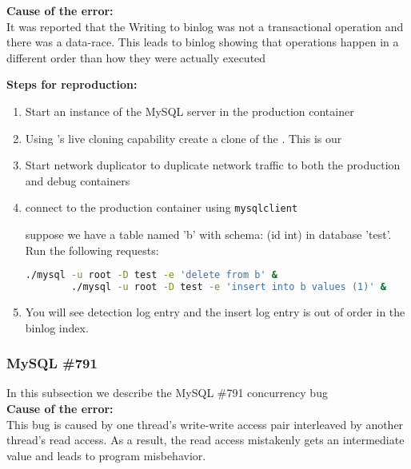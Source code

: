 \noindent \textbf{Cause of the error:} \\
It was reported that the Writing to binlog was not a transactional operation and there was a data-race. 
This leads to binlog showing that operations happen in a different order than how they were actually executed

\noindent \textbf{Steps for reproduction:} \\

\begin{adjustwidth}{0.5cm}{}
	\begin{enumerate}
		\item Start an instance of the MySQL server in the production container
		\item Using \parikshan's live cloning capability create a clone of the \productioncontainer. This is our \debugcontainer
		\item Start network duplicator to duplicate network traffic to both the production and debug containers
		\item connect to the production container using \texttt{mysqlclient}
		
		suppose we have a table named 'b' with schema: (id int) in database 'test'.
		Run the following requests:
		
		\begin{lstlisting}[language=sh]
		./mysql -u root -D test -e 'delete from b' &
		./mysql -u root -D test -e 'insert into b values (1)' &
		\end{lstlisting}
		
		\item You will see detection log entry and the insert log entry is out of order in the binlog index.
		
	\end{enumerate}
\end{adjustwidth}



\subsubsection{MySQL \#791}

In this subsection we describe the MySQL \#791 concurrency bug \\

\noindent \textbf{Cause of the error:} \\

This bug is caused by one thread's write-write access pair interleaved by another thread's read access. As a result, the read access mistakenly gets an intermediate value and leads to program misbehavior.

